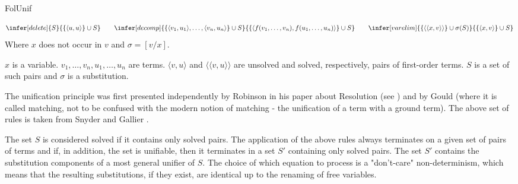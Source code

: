 \begin{entry}{FolUnif}

\newcommand{\upair}[2]{\langle#1, #2\rangle}
\newcommand{\spair}[2]{\langle\langle#1, #2\rangle\rangle}

\begin{calculus}
\[
\infer[delete] {S}
               {\{\upair u u\} \cup S}
\qquad
\infer[decomp] {\{\upair {v_1} {u_1} ,\ldots, \upair {v_n} {u_n}\}  \cup S}
               {\{\upair {f(v_1,\ldots,v_n)} {f(u_1,\ldots,u_n)}\} \cup S}
\qquad
\infer[varelim]{\{\spair x v\} \cup \sigma(S)}
               {\{\upair x v\} \cup S}
\]
Where $x$ does not occur in $v$ and $\sigma = [v/x]$.
\end{calculus}

\begin{clarifications}
  $x$ is a variable. $v_1,\ldots,v_n, u_1,\ldots, u_n$ are terms.
  $\upair v u$ and $\spair v u$ are unsolved and solved, respectively, pairs of first-order terms.
  $S$ is a set of such pairs and $\sigma$ is a substitution.
\end{clarifications}

\begin{history}
   The unification principle was first presented independently by Robinson
   in his paper about Resolution \cite{Robinson1965JACM} (see )
   and by Gould \cite{guard1964automated} (where it is called matching, not to
   be confused with the modern notion of matching - the unification of a term
   with a ground term).
   The above set of rules is taken from Snyder and Gallier \cite{Snyder1989101}.
\end{history}

\begin{technicalities}
   The set $S$ is considered
   solved if it contains only solved pairs. The application of the above rules always terminates on a given set of pairs of terms
   and if, in addition, the set is unifiable, then it terminates in a set $S'$ containing only solved pairs.
   The set $S'$ contains the substitution components \cite{Robinson1965JACM} of a most general unifier of $S$.
   The choice of which equation to process is a "don't-care" non-determinism, which means
   that the resulting substitutions, if they exist, are identical up to the renaming of free variables.
 \end{technicalities}


\end{entry}
